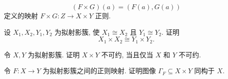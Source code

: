 \begin{BookExercises}
  \[
    (F\times G)(a)=(F(a),G(a))
  \]
  定义的映射 $F\times G:Z\to X\times Y$ 正则.
  \item\label{ex:quasiprojective-products-and-isomorphisms} 设 $X_{1},X_{2},Y_{1},Y_{2}$ 为拟射影簇, 使 $X_{1}\cong X_{2}$ 且 $Y_{1}\cong Y_{2}$. 证明
  \[
    X_{1}\times X_{2}\cong Y_{1}\times Y_{2}.
  \]
  \item\label{ex:quasiprojective-product-irreducible-iff-factors-are} 令 $X,Y$ 为拟射影簇. 证明 $X\times Y$ 不可约, 当且仅当 $X$ 和 $Y$ 不可约.
  \item\label{ex:graph-of-regular-map-is-isomorphic-to-domain} 令 $F:X\to Y$ 为拟射影簇之间的正则映射. 证明图像 $\Gamma_{F}\subseteq X\times Y$ 同构于 $X$.
\end{BookExercises}
